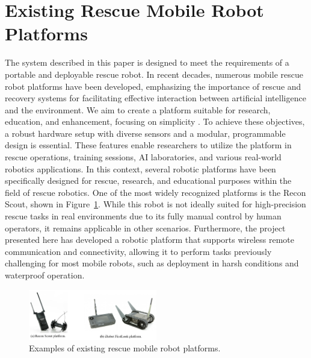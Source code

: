 \documentclass[conference]{IEEEtran}
\begin{document}
\section{Existing Rescue Mobile Robot Platforms}
The system described in this paper is designed to meet the requirements of a portable and deployable rescue robot. In recent decades, numerous mobile rescue robot platforms have been developed, emphasizing the importance of rescue and recovery systems for facilitating effective interaction between artificial intelligence and the environment. We aim to create a platform suitable for research, education, and enhancement, focusing on simplicity \cite{Mathew2014, Karimi2017}. To achieve these objectives, a robust hardware setup with diverse sensors and a modular, programmable design is essential. These features enable researchers to utilize the platform in rescue operations, training sessions, AI laboratories, and various real-world robotics applications. In this context, several robotic platforms have been specifically designed for rescue, research, and educational purposes within the field of rescue robotics. One of the most widely recognized platforms is the Recon Scout, shown in Figure~\ref{Fig_iRobotAndRecon}. While this robot is not ideally suited for high-precision rescue tasks in real environments due to its fully manual control by human operators, it remains applicable in other scenarios. Furthermore, the project presented here has developed a robotic platform that supports wireless remote communication and connectivity, allowing it to perform tasks previously challenging for most mobile robots, such as deployment in harsh conditions and waterproof operation.

\begin{figure}[htbp] 
    \centerline{\includegraphics[width=0.5\textwidth]{Fig_iRobotAndRecon.PNG}} 
    \caption{Examples of existing rescue mobile robot platforms.} 
    \label{Fig_iRobotAndRecon} 
\end{figure}
\end{document}
